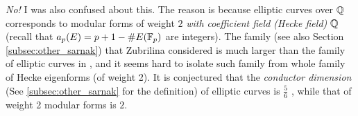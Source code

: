 \emph{No!} I was also confused about this.
The reason is because elliptic curves over $\mathbb{Q}$ corresponds to modular forms of weight $2$ \emph{with coefficient field (Hecke field) $\mathbb{Q}$} (recall that $a_p(E) = p + 1 - \#E(\mathbb{F}_p)$ are integers).
The family (see also Section \ref{subsec:other_sarnak}) that Zubrilina considered is much larger than the family of elliptic curves in \cite{he2024murmurations}, and it seems hard to isolate such family from whole family of Hecke eigenforms (of weight 2).
It is conjectured that the \emph{conductor dimension} (See \ref{subsec:other_sarnak} for the definition) of elliptic curves is $\frac{5}{6}$ \cite{shankar2019families}, while that of weight 2 modular forms is $2$.